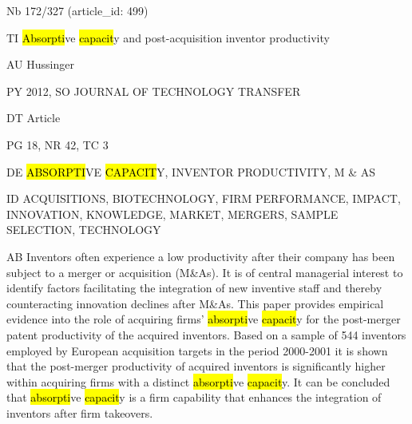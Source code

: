 \documentclass[a4paper]{article}
\begin{document}
\vspace*{-2cm}
Nb \tabto{0cm}172/327 (article\_id: 499)\par
TI \tabto{0cm}\hl{Absorpti}ve \hl{capacit}y and post-acquisition inventor productivity\par
AU \tabto{0cm}Hussinger\par
PY \tabto{0cm}2012, SO JOURNAL OF TECHNOLOGY TRANSFER\par
DT \tabto{0cm}Article\par
PG \tabto{0cm}18, NR 42, TC 3\par
DE \tabto{0cm}\hl{ABSORPTI}VE \hl{CAPACIT}Y, INVENTOR PRODUCTIVITY, M \& AS\par
ID \tabto{0cm}ACQUISITIONS, BIOTECHNOLOGY, FIRM PERFORMANCE, IMPACT, INNOVATION, KNOWLEDGE, MARKET, MERGERS, SAMPLE SELECTION, TECHNOLOGY\par
AB \tabto{0cm}Inventors often experience a low productivity after their company has been subject to a merger or acquisition (M\&As). It is of central managerial interest to identify factors facilitating the integration of new inventive staff and thereby counteracting innovation declines after M\&As. This paper provides empirical evidence into the role of acquiring firms' \hl{absorpti}ve \hl{capacit}y for the post-merger patent productivity of the acquired inventors. Based on a sample of 544 inventors employed by European acquisition targets in the period 2000-2001 it is shown that the post-merger productivity of acquired inventors is significantly higher within acquiring firms with a distinct \hl{absorpti}ve \hl{capacit}y. It can be concluded that \hl{absorpti}ve \hl{capacit}y is a firm capability that enhances the integration of inventors after firm takeovers.\par
\clearpage
\end{document}
